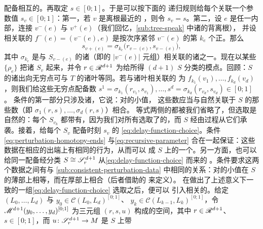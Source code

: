 \trDisk{}配备相互\trCompatible{}的\trLagrange\trLabel。再取定 $s\in[0;1]$。于是可以按下面的%
递归规则给每个\trVertex{}关联一个参数值 $s_v\in[0;1]$：第一，若 $v$ 是离根最近的%
\trVertex，则令 $s_v=s$。第二，设 $e$ 是任一内部\trEdge，连接\trVertex{}
$v^-(e)$ 与 $v^+(e)$（我们回忆，\cref{sub:tree-speak} 中诸\trEdge{}的\trOrientation{}背离根），
并设相关联的\trFlag{} $f^-(e)=(v^-(e),e)$ 是按\trCanonical{}次序紧邻 $v^-(e)$ 的第
$k_e$ 个正\trFlag。那么
\begin{equation}\label{eq:recursive-parameter}
s_{v+(e)}=\sigma_{k_e}\bigl(r_{v-(e)},s_{v-(e)}\bigr),
\end{equation}
其中 $\sigma_{k_e}$ 是与 $S_{v-(e)}$ 的诸\trLabel{}（即\trLagrange\trSubmanifold{}的
$|v^-(e)|$ 元组）相关联的诸\trDelayFunction{}之一。现在以某些\trGluingParameter{} $\{\rho_e\}$
把诸 $S_v$ \trGluing{}起来，并令 $r\in\mathscr{R}^{d+1}$ 为给所得 $(d{+}1)$ \trPointedDisc{} $S$
分类的模点。回顾：$S$ 的诸出向无穷点可与 $T$ 的诸叶等同。若与诸叶相关联的%
\trFlag{}为 $f_{k_1}(v_1),\ldots,f_{k_d}(v_d)$，则我们给这些无穷点配备数
$s^1=\sigma_{k_1}(r_{v_1},s_{v_1}),\ldots,s^d=\sigma_{k_d}(r_{v_d},s_{v_d})\in[0;1]$。
\trConsistency{}条件的第一部分只涉及诸\trDelayFunction，它说：对\trGluingParameter{}的小值，
这些数应当与自然关联于 $S$ 的那些数（即 $\sigma_1(r,s),\ldots,\sigma_d(r,s)$）相合。
等式两侧的\trLagrange\trLabel{}都被我们省略了，但选取是自然的：每个 $S_{v_k}$
都带有\trLagrange\trLabel，因为我们对所有\trVertex{}选取了\trCompatible{}的\trLabel，而 $S$
经由\trGluing{}过程从它们承袭\trLabel。接着，给每个 $S_v$ 配备时刻 $s_v$ 的%
\trPerturbationDatum{} \eqref{eq:delay-function-choice}。条件
\eqref{eq:perturbation-homotopy-ends} 与\eqref{eq:recursive-parameter}
合在一起保证：这些数据在相应的出端\trStriplikeEnd{}上有相同的行为，从而可以\trGluing
成 $S$ 上的一个\trPerturbationDatum。另一方面，也可以给同一\trDisk{}配备经分类\trIsomorphism%
$S\cong\mathscr{S}^{d+1}_r$ 从\eqref{eq:delay-function-choice} \trPullback{}而来的%
\trPerturbationDatum。\trConsistency{}条件要求这两个数据之间有与
\cref{sub:consistent-perturbation-data} 中相同的关系：对\trGluingParameter{}的小值在 $S$
的薄部上相等，而在厚部上\trAsymptotic{}相合（后者借助\trUniversal\trFamily{}的%
\trPartialCompactification{}来定义）。
在做出了上述意义下一致的一组\eqref{eq:delay-function-choice} 选取之后，便可以
引入相关的\trModuliSpace。给定 $(L_0,\ldots,L_d)$ 与 $y_0\in\mathscr{C}(L_0,L_d)^{[0;1]}$、
$y_k\in\mathscr{C}(L_{k-1},L_k)^{[0;1]}$，令 $\mathscr{M}^{d+1}(y_0,\ldots,y_d)^{[0;1]}$
为三元组 $(r,s,u)$ 构成的空间，其中 $r\in\mathscr{R}^{d+1}$、$s\in[0;1]$，而
$u\colon\mathscr{S}^{d+1}_r\to M$ 是 $S$ 上带\trPerturbationDatum{}
